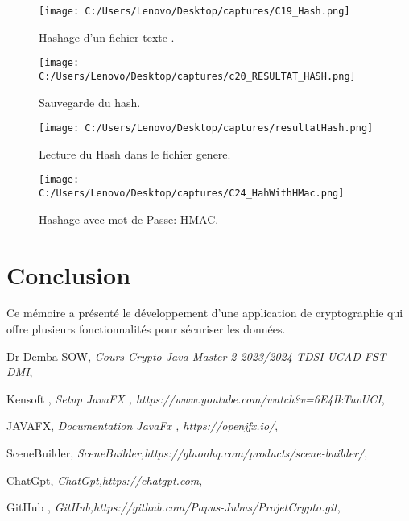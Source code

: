 \documentclass[a4paper,12pt]{report}
\begin{document}
  \begin{figure}[h!]
 	\centering
 	\texttt{[image: C:/Users/Lenovo/Desktop/captures/C19\_Hash.png]}
 	\caption{Hashage d'un fichier texte .}
 \end{figure}
 
  \begin{figure}[h!]
 	\centering
 	\texttt{[image: C:/Users/Lenovo/Desktop/captures/c20\_RESULTAT\_HASH.png]}
 	\caption{Sauvegarde du hash.}
 \end{figure}
 
  \begin{figure}[h!]
 	\centering
 	\texttt{[image: C:/Users/Lenovo/Desktop/captures/resultatHash.png]}
 	\caption{Lecture du Hash dans le fichier genere.}
 \end{figure}
 
  \begin{figure}[h!]
 	\centering
 	\texttt{[image: C:/Users/Lenovo/Desktop/captures/C24\_HahWithHMac.png]}
 	\caption{Hashage avec mot de Passe: HMAC.}
 \end{figure}
 
 
 

 
	
	\chapter{Conclusion}
	Ce mémoire a présenté le développement d'une application de cryptographie qui offre plusieurs fonctionnalités pour sécuriser les données.
	
	\begin{thebibliography}{9}
	   Dr	Demba SOW, 
		\textit{Cours Crypto-Java Master 2 2023/2024 TDSI UCAD FST DMI}, 
		
		
	
		
	Kensoft	, 
		\textit{Setup JavaFX ,	https://www.youtube.com/watch?v=6E4IkTuvUCI}, 
		
	JAVAFX, 
		\textit{Documentation JavaFx , https://openjfx.io/}, 
		
		
		
		SceneBuilder, 
		\textit{SceneBuilder,https://gluonhq.com/products/scene-builder/}, 
	

	
	ChatGpt, 
	\textit{ChatGpt,https://chatgpt.com}, 
	

GitHub	, 
	\textit{GitHub,https://github.com/Papus-Jubus/ProjetCrypto.git}, 
	
	\end{thebibliography}
	
\end{document}
